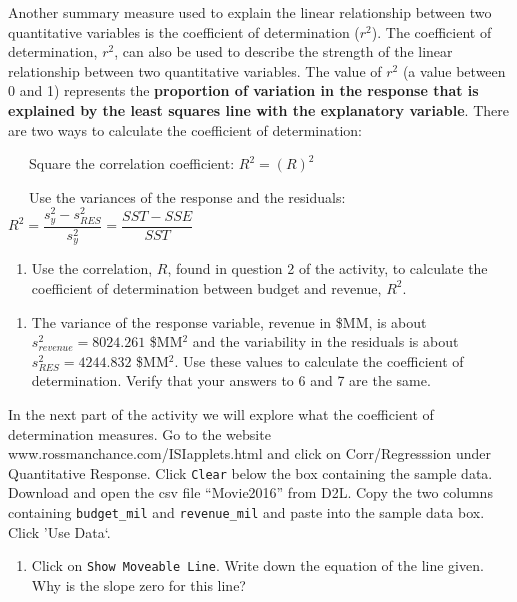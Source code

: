 \documentclass[
]{report}
\providecommand{\tightlist}{%
  \setlength{\itemsep}{0pt}\setlength{\parskip}{0pt}}
\begin{document}
Another summary measure used to explain the linear relationship between two quantitative variables is the coefficient of determination (\(r^2\)). The coefficient of determination, \(r^2\), can also be used to describe the strength of the linear relationship between two quantitative variables. The value of \(r^2\) (a value between 0 and 1) represents the \textbf{proportion of variation in the response that is explained by the least squares line with the explanatory variable}. There are two ways to calculate the coefficient of determination:

~~~Square the correlation coefficient: \(R^2 = (R)^2\)

~~~Use the variances of the response and the residuals: \(R^2 = \dfrac{s_y^2 - s_{RES}^2}{s_y^2} = \dfrac{SST - SSE}{SST}\)

\begin{enumerate}
\def\labelenumi{\arabic{enumi}.}
\setcounter{enumi}{5}
\tightlist
\item
  Use the correlation, \(R\), found in question 2 of the activity, to calculate the coefficient of determination between budget and revenue, \(R^2\).
\end{enumerate}

\vspace{.4in}

\begin{enumerate}
\def\labelenumi{\arabic{enumi}.}
\setcounter{enumi}{6}
\tightlist
\item
  The variance of the response variable, revenue in \$MM, is about \(s_{revenue}^2 = 8024.261\) \$MM\(^2\) and the variability in the residuals is about \(s_{RES}^2 = 4244.832\) \$MM\(^2\). Use these values to calculate the coefficient of determination. Verify that your answers to 6 and 7 are the same.
\end{enumerate}

\vspace{1in}

In the next part of the activity we will explore what the coefficient of determination measures. Go to the website www.rossmanchance.com/ISIapplets.html and click on Corr/Regresssion under Quantitative Response. Click \texttt{Clear} below the box containing the sample data. Download and open the csv file ``Movie2016'' from D2L. Copy the two columns containing \texttt{budget\_mil} and \texttt{revenue\_mil} and paste into the sample data box. Click 'Use Data`.

\begin{enumerate}
\def\labelenumi{\arabic{enumi}.}
\setcounter{enumi}{7}
\tightlist
\item
  Click on \texttt{Show\ Moveable\ Line}. Write down the equation of the line given. Why is the slope zero for this line?
\end{enumerate}
\end{document}
